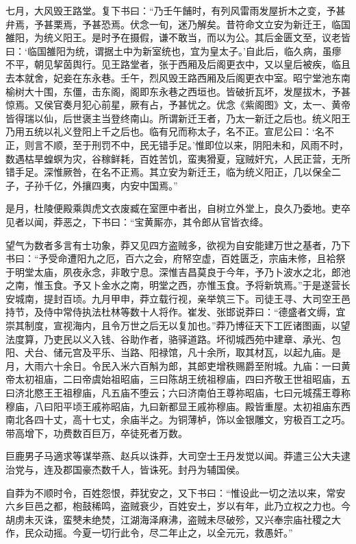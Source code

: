 \documentclass[12pt,UTF8]{ctexbook}
\begin{document}
七月，大风毁王路堂。复下书曰：“乃壬午餔时，有列风雷雨发屋折木之变，予甚弁焉，予甚栗焉，予甚恐焉。伏念一旬，迷乃解矣。昔符命文立安为新迁王，临国雒阳，为统义阳王。是时予在摄假，谦不敢当，而以为公。其后金匮文至，议老皆曰：‘临国雒阳为统，谓据土中为新室统也，宜为皇太子。’自此后，临久病，虽瘳不平，朝见挈茵舆行。见王路堂者，张于西厢及后阁更衣中，又以皇后被疾，临且去本就舍，妃妾在东永巷。壬午，烈风毁王路西厢及后阁更衣中室。昭宁堂池东南榆树大十围，东僵，击东阁，阁即东永巷之西垣也。皆破折瓦坏，发屋拔木，予甚惊焉。又侯官奏月犯心前星，厥有占，予甚忧之。优念《紫阁图》文，太一、黄帝皆得瑞以仙，后世褒主当登终南山。所谓新迁王者，乃太一新迁之后也。统义阳王乃用五统以礼义登阳上千之后也。临有兄而称太子，名不正。宣尼公曰：‘名不正，则言不顺，至于刑罚不中，民无错手足。’惟即位以来，阴阳未和，风雨不时，数遇枯旱蝗螟为灾，谷稼鲜耗，百姓苦饥，蛮夷猾夏，寇贼奸宄，人民正营，无所错手足。深惟厥咎，在名不正焉。其立安为新迁王，临为统义阳正，几以保全二子，子孙千亿，外攘四夷，内安中国焉。”



是月，杜陵便殿乘舆虎文衣废臧在室匣中者出，自树立外堂上，良久乃委地。吏卒见者以闻，莽恶之，下书曰：“宝黄厮亦，其令郎从官皆衣绛。



望气为数者多言有士功象，莽又见四方盗贼多，欲视为自安能建万世之基者，乃下书曰：“予受命遭阳九之厄，百六之会，府帑空虚，百姓匮乏，宗庙未修，且袷祭于明堂太庙，夙夜永念，非敢宁息。深惟吉昌莫良于今年，予乃卜波水之北，郎池之南，惟玉食。予又卜金水之南，明堂之西，亦惟玉食。予将新筑焉。”于是遂营长安城南，提封百顷。九月甲申，莽立载行视，亲举筑三下。司徒王寻、大司空王邑持节，及侍中常侍执法杜林等数十人将作。崔发、张邯说莽曰：“德盛者文缛，宜崇其制度，宣视海内，且令万世之后无以复加也。”莽乃博征天下工匠诸图画，以望法度算，乃吏民以义入钱、谷助作者，骆驿道路。坏彻城西苑中建章、承光、包阳、犬台、储元宫及平乐、当路、阳禄馆，凡十余所，取其材瓦，以起九庙。是月，大雨六十余日。令民入米六百斛为郎，其郎吏增秩赐爵至附城。九庙：一曰黄帝太初祖庙，二曰帝虞始祖昭庙，三曰陈胡王统祖穆庙，四曰齐敬王世祖昭庙，五曰济北愍王王祖穆庙，凡五庙不堕云；六曰济南伯王尊祢昭庙，七曰元城孺王尊称穆庙，八曰阳平顷王戚祢昭庙，九曰新都显王戚祢穆庙。殿皆重屋。太初祖庙东西南北各四十丈，高十七丈，余庙半之。为铜薄栌，饰以金银雕文，穷极百工之巧。带高增下，功费数百巨万，卒徒死者万数。



巨鹿男子马適求等谋举燕、赵兵以诛莽，大司空士王丹发觉以闻。莽遣三公大夫逮治党与，连及郡国豪杰数千人，皆诛死。封丹为辅国侯。



自莽为不顺时令，百姓怨恨，莽犹安之，又下书曰：“惟设此一切之法以来，常安六乡巨邑之都，枹鼓稀鸣，盗贼衰少，百姓安土，岁以有年，此乃立权之力也。今胡虏未灭诛，蛮僰未绝焚，江湖海泽麻沸，盗贼未尽破殄，又兴奉宗庙社稷之大作，民众动摇。今夏一切行此令，尽二年止之，以全元元，救愚奸。”
\end{document}
